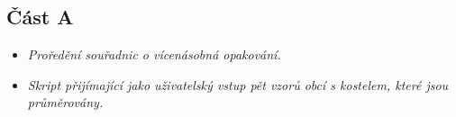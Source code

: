\subsection*{Část A}
\begin{itemize}
    \item \textit{Proředění souřadnic o vícenásobná opakování.}
    \item \textit{Skript přijímající jako uživatelský vstup pět vzorů obcí s kostelem, které jsou průměrovány.}
\end{itemize}